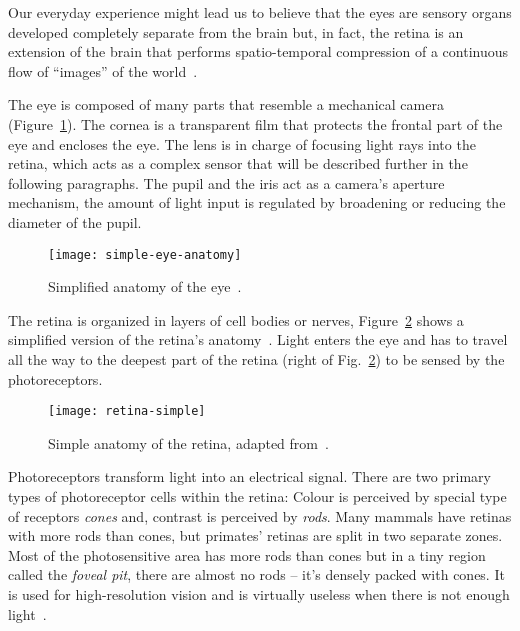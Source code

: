 Our everyday experience might lead us to believe that the eyes are sensory organs developed completely separate from the brain but, in fact, the retina is an extension of the brain that performs spatio-temporal compression of a continuous flow of ``images'' of the world~\cite{eye-brain-vision-hubel1995}.

The eye is composed of many parts that resemble a mechanical camera (Figure~\ref{fig:vision:eye}). The cornea is a transparent film that protects the frontal part of the eye and encloses the eye. The lens is in charge of focusing light rays into the retina, which acts as a complex sensor that will be described further in the following paragraphs. The pupil and the iris act as a camera's aperture mechanism, the amount of light input is regulated by broadening or reducing the diameter of the pupil. 

\begin{figure}[htb]
  \begin{center}
    \texttt{[image: simple-eye-anatomy]}
    \caption{Simplified anatomy of the eye~\cite{webvision-images}.}
    \label{fig:vision:eye}
  \end{center}
\end{figure}

The retina is organized in layers of cell bodies or nerves,  Figure~\ref{fig:vision:simple-retina} shows a simplified version of the retina's anatomy~\cite{webvision-simple-retina}. Light enters the eye and has to travel all the way to the deepest part of the retina (right of Fig.~\ref{fig:vision:simple-retina}) to be sensed by the photoreceptors. 

\begin{figure}[h]
  \begin{center}
    \texttt{[image: retina-simple]}
    \caption{Simple anatomy of the retina, adapted from~\cite{webvision-images}.}
    \label{fig:vision:simple-retina}
  \end{center}
\end{figure}

Photoreceptors transform light into an electrical signal. There are two primary types of photoreceptor cells within the retina: Colour is perceived by special type of receptors \emph{cones} and, contrast is perceived by \emph{rods}. Many mammals have retinas with more rods than cones, but primates' retinas are split in two separate zones. Most of the photosensitive area has more rods than cones but in a tiny region called the \emph{foveal pit}, there are almost no rods -- it's densely packed with cones. It is used for high-resolution vision and is virtually useless when there is not enough light~\cite{eye-brain-vision-hubel1995}.

